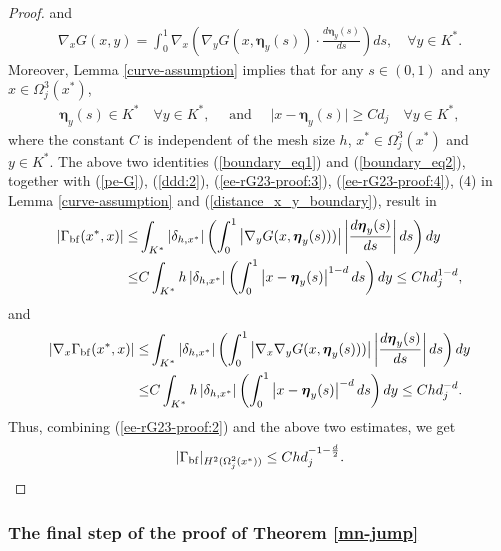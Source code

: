 \documentclass[1996/10/24]{amsart}
\theoremstyle{definition}
\numberwithin{equation}{section}
\begin{document}
\begin{proof}
and
\begin{align}
\label{boundary_eq2}
\nabla_x G(x,y)= \int_{0}^{1} \nabla_x\left(\nabla_yG(x,\boldsymbol{\eta}_{y}(s))
\cdot \frac{d \boldsymbol{\eta}_{y}(s)}{ds} \right) ds ,\quad \forall y\in K^{\ast}.
\end{align}
Moreover, Lemma \ref{curve-assumption} implies that for any $s \in (0,1)$ and any $x\in \Omega_{j}^{3}(x^{\ast})$,
\begin{align}
\label{distance_x_y_boundary}
\boldsymbol{\eta}_{y}(s) \in K^{\ast} \quad \forall y \in K^{\ast}, \quad \text{ and } \quad
\vert x - \boldsymbol{\eta}_{y}(s) \vert \geq Cd_{j}\quad \forall y \in K^{\ast},
\end{align}
where the constant $C$ is independent of the mesh size $h$, $x^{\ast} \in \Omega_{j}^{3}(x^{\ast})$
and $y \in K^{\ast}$.
The above two identities (\ref{boundary_eq1}) and (\ref{boundary_eq2}), together with (\ref{pe-G}),
(\ref{ddd:2}), (\ref{ee-rG23-proof:3}), (\ref{ee-rG23-proof:4}), (4) in Lemma \ref{curve-assumption} and
(\ref{distance_x_y_boundary}), result in
\begin{align*}
\left|\Gamma_{{\rm bf}}(x^{\ast},x)\right|\leq&\int_{K^{\ast}}\left|\delta_{h,x^{\ast}}\right|
\left( \int_{0}^{1} \left|\nabla_{y} G(x, \boldsymbol{\eta}_{y}(s) ))\right|
\left| \frac{d \boldsymbol{\eta}_{y}(s)}{ds} \right| ds \right) dy\\
\leq& C\int_{K^{\ast}}h\left|\delta_{h,x^{\ast}}\right|
\left(\int_{0}^{1}\left| x - \boldsymbol{\eta}_{y}(s) \right|^{1-d}ds \right) dy\leq Chd_j^{1-d},
\end{align*}
and
\begin{align*}
\left|\nabla_x\Gamma_{{\rm bf}}(x^{\ast},x)\right|\leq&\int_{K^{\ast}}\left|\delta_{h,x^{\ast}}\right|
\left( \int_{0}^{1} \left| \nabla_{x} \nabla_{y} G(x, \boldsymbol{\eta}_{y}(s) ))\right|
\left| \frac{d \boldsymbol{\eta}_{y}(s)}{ds} \right| ds \right) dy\\
\leq& C\int_{K^{\ast}}h\left|\delta_{h,x^{\ast}}\right|
\left(\int_{0}^{1}\left| x - \boldsymbol{\eta}_{y}(s) \right|^{-d}ds \right) dy\leq Chd_j^{-d}.
\end{align*}
Thus, combining (\ref{ee-rG23-proof:2}) and the above two estimates, we get
\begin{align*}
|\Gamma_{{\rm bf}}|_{H^2(\Omega_j^2(x^{\ast}))}\leq Chd_j^{-1-\frac{d}{2}}.
\end{align*}
\end{proof}

\subsubsection{The final step of the proof of Theorem \ref{mn-jump}}
\label{sec3:3.7}
\end{document}
